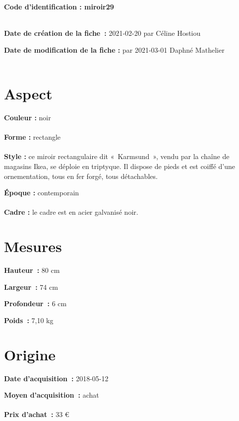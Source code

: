  
    
    
    {\bf \huge Code d’identification : miroir29}
    \\ \\ \hr
    \begin{center}
    \end{center}
    
    {\bf \large Date de création de la fiche :} 2021-02-20
    {par Céline Hostiou}
  
    {\bf \large Date de modification de la fiche :} 
    {par 2021-03-01}
    Daphné Mathelier \\ \\ \hr
    \section* {Aspect}
   {\bf \large Couleur :} noir
    \\ \\ {\bf \large Forme :}  rectangle
    \\ \\ {\bf \large Style :} 
            ce miroir rectangulaire dit « Karmsund », vendu par la chaîne de
            magasins Ikea, se déploie en triptyque. Il dispose de pieds et est coiffé d’une
            ornementation, tous en fer forgé, tous détachables.
        
        {\bf \large Époque :} contemporain
    \\ \\ {\bf \large Cadre :} le cadre est en acier galvanisé noir.
        
    \section* {Mesures}
      
  {\bf \large Hauteur :} 80 cm
   
   {\bf \large Largeur :} 74 cm
    
   {\bf \large Profondeur :} 6 cm
    
   {\bf \large Poids :} 7,10 kg
     
    \section* {Origine}
    {\bf \large Date d’acquisition :} 2018-05-12

    {\bf \large Moyen d’acquisition :} achat
          \\ \\{\bf \large Prix d’achat :} 33 €
        

